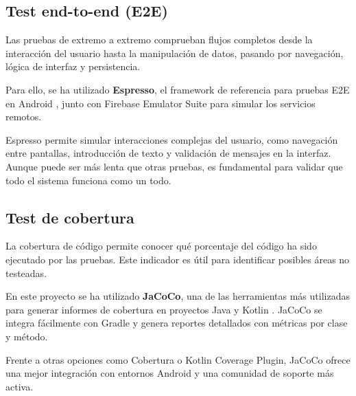 \subsection{Test end-to-end (E2E)}

Las pruebas de extremo a extremo comprueban flujos completos desde la interacción del usuario hasta la manipulación de datos, pasando por navegación, lógica de interfaz y persistencia.

Para ello, se ha utilizado \textbf{Espresso}, el framework de referencia para pruebas E2E en Android \cite{android-testing}, junto con Firebase Emulator Suite para simular los servicios remotos.

Espresso permite simular interacciones complejas del usuario, como navegación entre pantallas, introducción de texto y validación de mensajes en la interfaz. Aunque puede ser más lenta que otras pruebas, es fundamental para validar que todo el sistema funciona como un todo.

\subsection{Test de cobertura}

La cobertura de código permite conocer qué porcentaje del código ha sido ejecutado por las pruebas. Este indicador es útil para identificar posibles áreas no testeadas.

En este proyecto se ha utilizado \textbf{JaCoCo}, una de las herramientas más utilizadas para generar informes de cobertura en proyectos Java y Kotlin \cite{jacoco}. JaCoCo se integra fácilmente con Gradle y genera reportes detallados con métricas por clase y método.

Frente a otras opciones como Cobertura o Kotlin Coverage Plugin, JaCoCo ofrece una mejor integración con entornos Android y una comunidad de soporte más activa.
